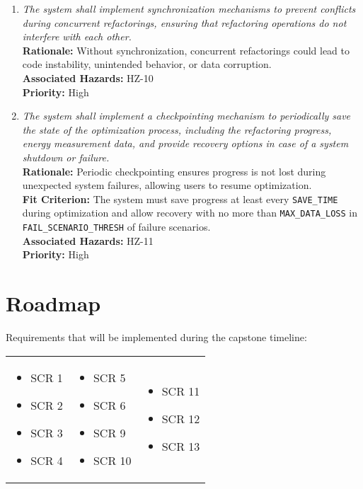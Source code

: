 \documentclass{article}
\begin{document}
\begin{enumerate}[label=SCR \arabic*., wide=0pt, leftmargin=*]
    \item \emph{The system shall implement synchronization mechanisms to prevent conflicts during concurrent refactorings, ensuring that refactoring operations do not interfere with each other.}\\
    {\bf Rationale:} Without synchronization, concurrent refactorings could lead to code instability, unintended behavior, or data corruption.\\
    {\bf Associated Hazards:} HZ-10\\
    {\bf Priority:} High

    \item \emph{The system shall implement a checkpointing mechanism to periodically save the state of the optimization process, including the refactoring progress, energy measurement data, and provide recovery options in case of a system shutdown or failure.}\\
    {\bf Rationale:} Periodic checkpointing ensures progress is not lost during unexpected system failures, allowing users to resume optimization.\\
    {\bf Fit Criterion:} The system must save progress at least every \texttt{SAVE\_TIME} during optimization and allow recovery with no more than \texttt{MAX\_DATA\_LOSS} in \texttt{FAIL\_SCENARIO\_THRESH} of failure scenarios.\\
    {\bf Associated Hazards:} HZ-11\\
    {\bf Priority:} High

\end{enumerate}

\section{Roadmap}

Requirements that will be implemented during the capstone timeline:

\renewcommand{\arraystretch}{1.2}
\begin{tabular}{p{} p{} p{}}
    \begin{itemize}[wide=0pt]
        \item SCR 1
        \item SCR 2
        \item SCR 3
        \item SCR 4
    \end{itemize} &
    \begin{itemize}[wide=0pt]
        \item SCR 5
        \item SCR 6
        \item SCR 9
        \item SCR 10
    \end{itemize} &
    \begin{itemize}[wide=0pt]
        \item SCR 11
        \item SCR 12
        \item SCR 13
    \end{itemize} \\
\end{tabular}
\end{document}
